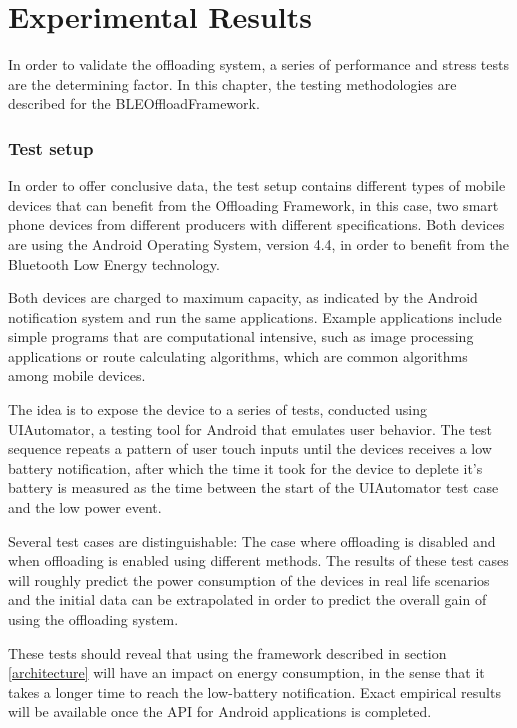 \chapter{Experimental Results}
\label{chapter:results}


In order to validate the offloading system, a series of performance and stress tests are the determining factor. In this chapter, the testing methodologies are described for the BLEOffloadFramework.

\subsection{Test setup}

In order to offer conclusive data, the test setup contains different types of mobile devices that can benefit from the Offloading Framework, in this case, two smart phone devices from different producers with different specifications. Both devices are using the Android Operating System, version 4.4, in order to benefit from the Bluetooth Low Energy technology.

Both devices are charged to maximum capacity, as indicated by the Android notification system and run the same applications. Example applications include simple programs that are computational intensive, such as image processing applications or route calculating algorithms, which are common algorithms among mobile devices.

The idea is to expose the device to a series of tests, conducted using UIAutomator, a testing tool for Android that emulates user behavior. The test sequence repeats a pattern of user touch inputs until the devices receives a low battery notification, after which the time it took for the device to deplete it's battery is measured as the time between the start of the UIAutomator test case and the low power event.

Several test cases are distinguishable: The case where offloading is disabled and when offloading is enabled using different methods. The results of these test cases will roughly predict the power consumption of the devices in real life scenarios and the initial data can be extrapolated in order to predict the overall gain of using the offloading system.

These tests should reveal that using the framework described in section \ref{architecture} will have an impact on energy consumption, in the sense that it takes a longer time to reach the low-battery notification. Exact empirical results will be available once the API for Android applications is completed.